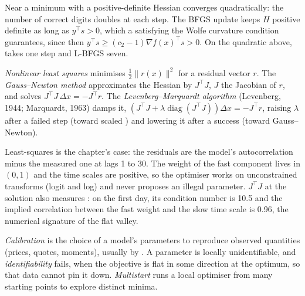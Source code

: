 Near a minimum with a positive-definite Hessian  converges quadratically: the number of correct digits doubles at each step. The BFGS update keeps $H$ positive definite
as long as $y^\top s > 0$, which a  satisfying the Wolfe curvature condition guarantees, since then $y^\top s \ge (c_2 - 1)\nabla f(x)^\top s > 0$. On the quadratic above,
 takes one step and L-BFGS seven.

\begin{definition}\label{def:qm:numerical-optimisation-in-practice:lm}
\emph{Nonlinear least squares} minimises $\frac12\lVert r(x)\rVert^2$ for a residual vector $r$. The \emph{Gauss--Newton method}
approximates the Hessian by $J^\top J$, $J$ the Jacobian of $r$, and solves $J^\top J\,\Delta x = -J^\top r$. The \emph{Levenberg--Marquardt algorithm} (Levenberg, 1944; Marquardt, 1963) damps it, $(J^\top J + \lambda\operatorname{diag}(J^\top J))\Delta x = -J^\top r$, raising $\lambda$ after a failed step (toward scaled
) and lowering it after a success (toward Gauss--Newton).
\end{definition}

Least-squares  is the chapter's case: the residuals are the model's autocorrelation minus the measured one at lags 1 to 30. The weight of the fast component lives in $(0, 1)$
and the time scales are positive, so the optimiser works on unconstrained transforms (logit and log) and never proposes an illegal parameter. $J^\top J$ at the solution also measures
: on the first day, its condition number is 10.5 and the implied correlation between the fast weight and the slow time scale is 0.96, the numerical signature of the flat
valley.

\begin{definition}\label{def:qm:numerical-optimisation-in-practice:calibration}
\emph{Calibration} is the choice of a model's parameters to reproduce observed quantities (prices, quotes, moments), usually by . A parameter is
locally unidentifiable, and \emph{identifiability} fails, when the objective is flat in some direction at the optimum, so that data cannot pin it down. \emph{Multistart}
runs a local optimiser from many starting points to explore distinct minima.
\end{definition}

